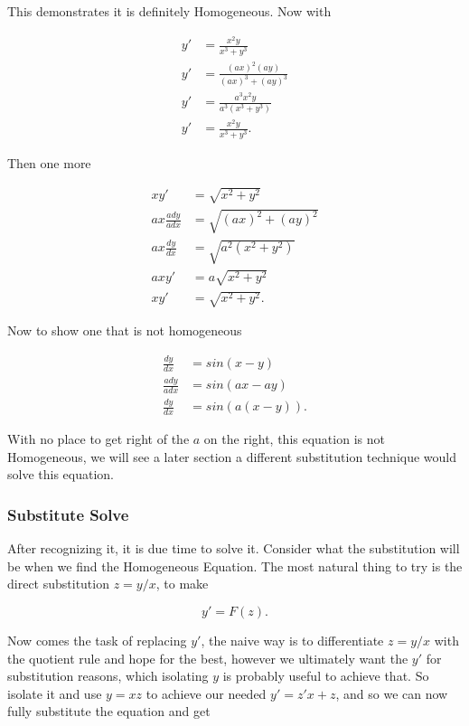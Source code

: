 \documentclass[12pt]{article}
\begin{document}
This demonstrates it is definitely Homogeneous. Now with

\begin{align*}
    y' &= \frac{x^2y}{x^3+y^3} \\
    y' &= \frac{(ax)^2(ay)}{(ax)^3+(ay)^3} \\
    y' &= \frac{a^3x^2y}{a^3(x^3+y^3)} \\
    y' &= \frac{x^2y}{x^3+y^3}.
\end{align*}

Then one more

\begin{align*}
    xy' &= \sqrt{x^2+y^2} \\
    ax \frac{ady}{adx} &= \sqrt{(ax)^2+(ay)^2} \\
    ax \frac{dy}{dx} &= \sqrt{a^2(x^2+y^2)} \\
    axy' &= a\sqrt{x^2+y^2} \\
    xy' &= \sqrt{x^2+y^2}.
\end{align*}

Now to show one that is not homogeneous

\begin{align*}
    \frac{dy}{dx}&=sin(x-y) \\
    \frac{ady}{adx}&=sin(ax-ay) \\
    \frac{dy}{dx}&=sin(a(x-y)).
\end{align*}

With no place to get right of the $a$ on the right, this equation is not Homogeneous, we will see a later section a different substitution technique would solve this equation. 

\subsubsection{Substitute Solve}

After recognizing it, it is due time to solve it. Consider what the substitution will be when we find the Homogeneous Equation. The most natural thing to try is the direct substitution $z=y/x$, to make

\begin{equation*}
    y'=F(z).
\end{equation*}

Now comes the task of replacing $y'$, the naive way is to differentiate $z=y/x$ with the quotient rule and hope for the best, however we ultimately want the $y'$ for substitution reasons, which isolating $y$ is probably useful to achieve that. So isolate it and use $y=xz$ to achieve our needed $y'=z'x+z$, and so we can now fully substitute the equation and get
\end{document}
